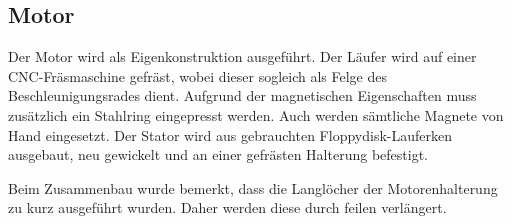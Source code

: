\subsection{Motor}
Der Motor wird als Eigenkonstruktion ausgeführt. Der Läufer wird auf einer CNC-Fräsmaschine gefräst, wobei dieser sogleich als Felge des 
Beschleunigungsrades dient. Aufgrund der magnetischen Eigenschaften muss 
zusätzlich ein Stahlring eingepresst werden. Auch werden sämtliche Magnete von Hand eingesetzt. Der Stator wird aus gebrauchten Floppydisk-Lauferken 
ausgebaut, neu gewickelt und an einer gefrästen Halterung befestigt.

Beim Zusammenbau wurde bemerkt, dass die Langlöcher der Motorenhalterung zu kurz ausgeführt wurden. Daher werden diese durch feilen verlängert.
